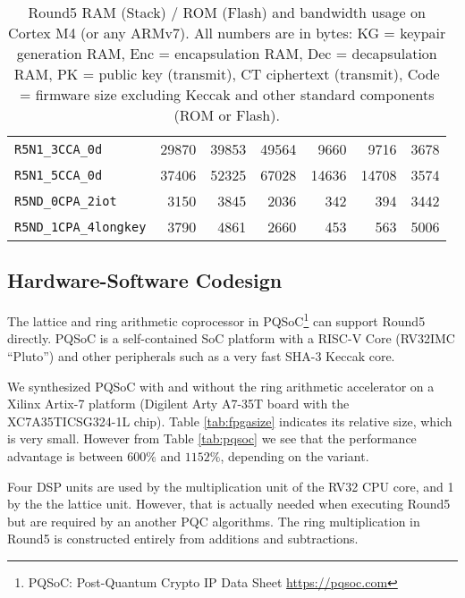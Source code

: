 \documentclass[a4paper]{article}
\begin{document}
\begin{table}
\begin{center}
\begin{tabular}{| l | n{5}{0} n{5}{0} n{5}{0} | n{5}{0} n{5}{0} | n{5}{0} | }
    \verb|R5N1_3CCA_0d| & 29870 & 39853 & 49564 & 9660  & 9716  & 3678  \\
    \verb|R5N1_5CCA_0d| & 37406 & 52325 & 67028 & 14636 & 14708 & 3574  \\
    \verb|R5ND_0CPA_2iot| & 3150  & 3845 & 2036 & 342   & 394   & 3442  \\
    \verb|R5ND_1CPA_4longkey| & 3790 & 4861 & 2660 & 453 & 563  & 5006  \\
    \hline
    \end{tabular}
    \caption{Round5 RAM (Stack) / ROM (Flash) and bandwidth usage on
        Cortex M4 (or any ARMv7). All numbers are in bytes:
        {KG} = keypair generation RAM,  {Enc} = encapsulation RAM,
        {Dec} = decapsulation RAM,      {PK} = public key (transmit),
        {CT} ciphertext (transmit),     {Code} = firmware size excluding
        Keccak and other standard  components (ROM or Flash).}
    \label{tab:m4size}
\end{center}
\end{table}

\subsection{Hardware-Software Codesign}

The lattice and ring arithmetic coprocessor in PQSoC\footnote{PQSoC:
Post-Quantum Crypto IP Data Sheet \url{https://pqsoc.com}} can support
Round5 directly. PQSoC is a self-contained SoC platform with a
RISC-V Core (RV32IMC ``Pluto'') and other peripherals such as a very
fast SHA-3 Keccak core.

We synthesized PQSoC with and without the ring arithmetic accelerator on
a Xilinx Artix-7 platform (Digilent Arty A7-35T board with the
XC7A35TICSG324-1L chip). Table \ref{tab:fpgasize} indicates its relative
size, which is very small. However from Table \ref{tab:pqsoc} we see
that the performance advantage is between $600\%$ and $1152\%$, depending
on the variant.

Four DSP units are used by the multiplication unit of the RV32 CPU core,
and 1 by the the lattice unit. However, that is actually needed when
executing Round5 but are required by an another PQC algorithms. The ring
multiplication in Round5 is constructed entirely from additions and
subtractions.
\end{document}
